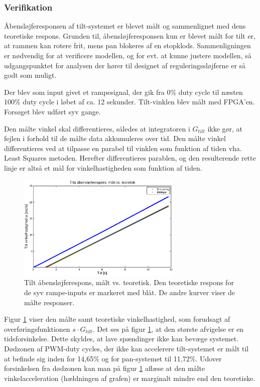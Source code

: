 \subsubsection{Verifikation}
\label{subsec:verifikation}
Åbensløjferesponsen af tilt-systemet er blevet målt og sammenlignet med dens teoretiske respons.
Grunden til, åbensløjferesponsen kun er blevet målt for tilt er, at rammen kan rotere frit,
mens pan blokeres af en stopklods.
Sammenligningen er nødvendig for at verificere modellen, og for evt. at kunne justere modellen,
så udgangspunktet for analysen der hører til designet af reguleringssløjferne er så godt som muligt.

Der blev som input givet et rampesignal, der gik fra 0\% duty cycle til næsten 100\% duty cycle
i løbet af ca. 12 sekunder. Tilt-vinklen blev målt med FPGA'en.
Forsøget blev udført syv gange.

Den målte vinkel skal differentieres, således at integratoren i \(G_{tilt}\) ikke gør,
at fejlen i forhold til de målte data akkumuleres over tid.
Den målte vinkel differentieres ved at tilpasse en parabel
til vinklen som funktion af tiden vha. Least Squares metoden. Herefter differentieres
parablen, og den resulterende rette linje er altså et mål for vinkelhastigheden som funktion af tiden.

\begin{figure}[th!]
	\centering
	\includegraphics[width=0.7\textwidth]{./graphics/openloopVelocity1.eps}
	\captionsetup{width=0.7\textwidth}
	\caption[Tilt åbensløjferespons, målt vs. teoretisk]
		{Tilt åbensløjferespons, målt vs. teoretisk.
		Den teoretiske respons for de syv rampe-inputs er markeret med blåt.
		De andre kurver viser de målte responser.}
	\label{fig:openloopV1}
\end{figure}

Figur \ref{fig:openloopV1} viser den målte samt teoretiske vinkelhastighed,
som forudsagt af overføringsfunktionen \(s\cdot{}G_{tilt}\).
Det ses på figur \ref{fig:openloopV1}, at den største afvigelse er en tidsforsinkelse.
Dette skyldes, at lave spændinger ikke kan bevæge systemet.
Dødzonen af PWM-duty cycles, der ikke kan accelerere tilt-systemet er målt til at befinde sig inden for 14,65\% og for pan-systemet til 11,72\%.
Udover forsinkelsen fra dødzonen kan man på figur \ref{fig:openloopV1} aflæse
at den målte vinkelacceleration (hældningen af grafen) er marginalt mindre end den teoretiske.

